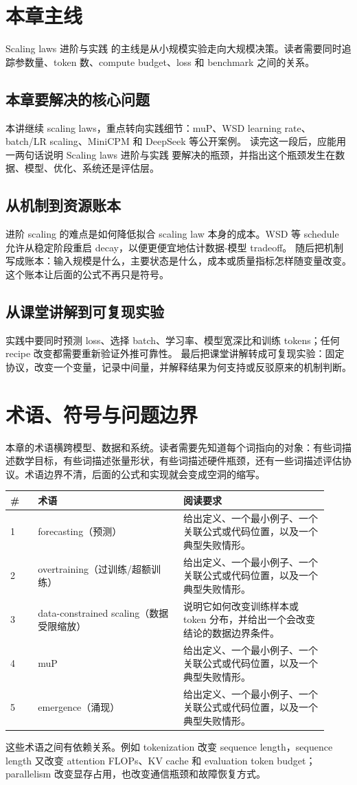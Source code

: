 \documentclass[a4paper]{article}
\begin{document}
\section{本章主线}
Scaling laws 进阶与实践 的主线是从小规模实验走向大规模决策。读者需要同时追踪参数量、token 数、compute budget、loss 和 benchmark 之间的关系。
\subsection{本章要解决的核心问题}
本讲继续 scaling laws，重点转向实践细节：muP、WSD learning rate、batch/LR scaling、MiniCPM 和 DeepSeek 等公开案例。
读完这一段后，应能用一两句话说明 Scaling laws 进阶与实践 要解决的瓶颈，并指出这个瓶颈发生在数据、模型、优化、系统还是评估层。
\subsection{从机制到资源账本}
进阶 scaling 的难点是如何降低拟合 scaling law 本身的成本。WSD 等 schedule 允许从稳定阶段重启 decay，以便更便宜地估计数据-模型 tradeoff。
随后把机制写成账本：输入规模是什么，主要状态是什么，成本或质量指标怎样随变量改变。这个账本让后面的公式不再只是符号。
\subsection{从课堂讲解到可复现实验}
实践中要同时预测 loss、选择 batch、学习率、模型宽深比和训练 tokens；任何 recipe 改变都需要重新验证外推可靠性。
最后把课堂讲解转成可复现实验：固定协议，改变一个变量，记录中间量，并解释结果为何支持或反驳原来的机制判断。
\section{术语、符号与问题边界}
本章的术语横跨模型、数据和系统。读者需要先知道每个词指向的对象：有些词描述数学目标，有些词描述张量形状，有些词描述硬件瓶颈，还有一些词描述评估协议。术语边界不清，后面的公式和实现就会变成空洞的缩写。
\begin{longtable}{p{0.08\linewidth}p{0.42\linewidth}p{0.42\linewidth}}
\toprule
\textbf{\#} & \textbf{术语} & \textbf{阅读要求}\\
\midrule
1 & forecasting（预测） & 给出定义、一个最小例子、一个关联公式或代码位置，以及一个典型失败情形。\\
2 & overtraining（过训练/超额训练） & 给出定义、一个最小例子、一个关联公式或代码位置，以及一个典型失败情形。\\
3 & data-constrained scaling（数据受限缩放） & 说明它如何改变训练样本或 token 分布，并给出一个会改变结论的数据边界条件。\\
4 & muP & 给出定义、一个最小例子、一个关联公式或代码位置，以及一个典型失败情形。\\
5 & emergence（涌现） & 给出定义、一个最小例子、一个关联公式或代码位置，以及一个典型失败情形。\\
\bottomrule
\end{longtable}
这些术语之间有依赖关系。例如 tokenization 改变 sequence length，sequence length 又改变 attention FLOPs、KV cache 和 evaluation token budget；parallelism 改变显存占用，也改变通信瓶颈和故障恢复方式。
\end{document}
